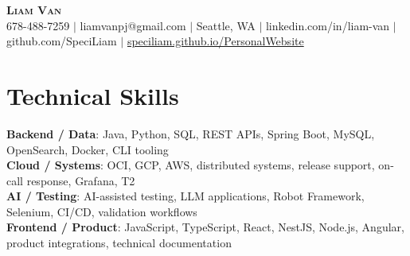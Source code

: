 \documentclass[letterpaper,11pt]{article}
\begin{document}

%
\begin{center}
    \textbf{\Huge \scshape Liam Van} \\ \vspace{1pt}
    \small 678-488-7259 $|$ \small {liamvanpj@gmail.com} $|$ Seattle, WA
 {{$|$ linkedin.com/in/liam-van} {$|$ github.com/SpeciLiam} {$|$ \href{https://speciliam.github.io/PersonalWebsite}{speciliam.github.io/PersonalWebsite}}}

\end{center}

\section{Technical Skills}
 \begin{itemize}[leftmargin=0.15in, label={}]
    \small{\item{
     \textbf{Backend / Data}{: Java, Python, SQL, REST APIs, Spring Boot, MySQL, OpenSearch, Docker, CLI tooling} \\
     \textbf{Cloud / Systems}{: OCI, GCP, AWS, distributed systems, release support, on-call response, Grafana, T2} \\
     \textbf{AI / Testing}{: AI-assisted testing, LLM applications, Robot Framework, Selenium, CI/CD, validation workflows} \\
     \textbf{Frontend / Product}{: JavaScript, TypeScript, React, NestJS, Node.js, Angular, product integrations, technical documentation} \\
    }}
 \end{itemize}
%
\end{document}
